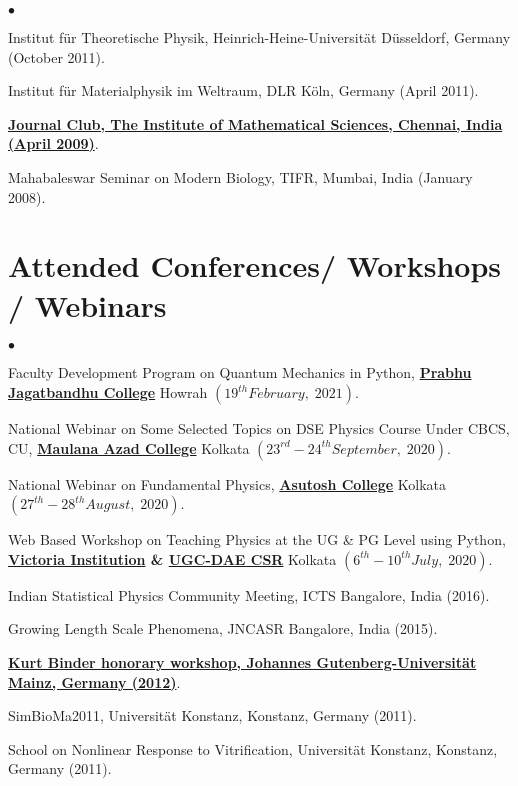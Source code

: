 \documentclass[margin,line]{res}
\newenvironment{list2}{
  \begin{list}{$\bullet$}{%
      \setlength{\itemsep}{0in}
      \setlength{\parsep}{0in} \setlength{\parskip}{0in}
      \setlength{\topsep}{0in} \setlength{\partopsep}{0in} 
      \setlength{\leftmargin}{0.2in}}}{\end{list}}
\begin{document}
\begin{resume}
\begin{list2}
\item Institut f\"ur Theoretische Physik, Heinrich-Heine-Universit\"at D\"usseldorf, Germany (October 2011).
\item Institut f\"ur Materialphysik im Weltraum, DLR K\"oln, Germany (April 2011). 
\item \href{http://www.slideshare.net/AmitBhattacharjee14/nonabelian-vortices-energetics-vs-topology}{\bf Journal Club, The Institute of 
      Mathematical Sciences, Chennai, India (April 2009)}.
\item Mahabaleswar Seminar on Modern Biology, TIFR, Mumbai, India (January 2008). 
\end{list2}

\section{\sc Attended Conferences/ Workshops / Webinars}
\begin{list2}
\item Faculty Development Program on Quantum Mechanics in Python, {\bf \href{https://pjc.ac.in/}{Prabhu Jagatbandhu College}} Howrah 
      $(19^{th} February,\; 2021)$. 
\item National Webinar on Some Selected Topics on DSE Physics Course Under CBCS, CU, {\bf \href{https://maulanaazadcollegekolkata.ac.in/}{Maulana 
      Azad College}} Kolkata $(23^{rd}-24^{th} September,\; 2020)$. 
\item National Webinar on Fundamental Physics, {\bf \href{https://asutoshcollege.in/}{Asutosh College}} Kolkata $(27^{th}-28^{th} August,\; 2020)$. 
\item Web Based Workshop on Teaching Physics at the UG \& PG Level using Python, {\bf \href{https://www.victoriacollege.co.in/}{Victoria Institution} 
\& \href{http://www.iuc.res.in/}{UGC-DAE CSR}} Kolkata $(6^{th}-10^{th} July,\; 2020)$. 
\item Indian Statistical Physics Community Meeting, ICTS Bangalore, India (2016).
\item Growing Length Scale Phenomena, JNCASR Bangalore, India (2015).
\item \href{http://www.slideshare.net/AmitBhattacharjee14/flow-reversal-and-bauschinger-effect-in-a-glass-forming-liquid}{\bf Kurt Binder 
      honorary workshop, Johannes Gutenberg-Universit\"{a}t Mainz, Germany (2012)}.
\item SimBioMa2011, Universit\"at Konstanz, Konstanz, Germany (2011).
\item School on Nonlinear Response to Vitrification, Universit\"at Konstanz, Konstanz, Germany (2011).

\end{list2}
\end{resume}
\end{document}
